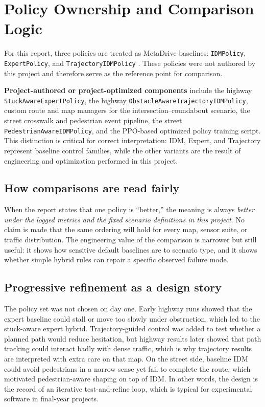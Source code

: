 \documentclass[12pt,a4paper]{report}
\begin{document}
\section{Policy Ownership and Comparison Logic}
For this report, three policies are treated as MetaDrive baselines: \texttt{IDMPolicy}, \texttt{ExpertPolicy}, and \texttt{TrajectoryIDMPolicy} \cite{metadrive,metadrive_docs}. These policies were not authored by this project and therefore serve as the reference point for comparison.

\noindent\textbf{Project-authored or project-optimized components} include the highway \texttt{StuckAwareExpertPolicy}, the highway \texttt{ObstacleAwareTrajectoryIDMPolicy}, custom route and map managers for the intersection--roundabout scenario, the street crosswalk and pedestrian event pipeline, the street \texttt{PedestrianAwareIDMPolicy}, and the PPO-based optimized policy training script. This distinction is critical for correct interpretation: IDM, Expert, and Trajectory represent baseline control families, while the other variants are the result of engineering and optimization performed in this project.

\subsection{How comparisons are read fairly}
When the report states that one policy is ``better,'' the meaning is always \emph{better under the logged metrics and the fixed scenario definitions in this project}. No claim is made that the same ordering will hold for every map, sensor suite, or traffic distribution. The engineering value of the comparison is narrower but still useful: it shows how sensitive default baselines are to scenario type, and it shows whether simple hybrid rules can repair a specific observed failure mode.

\subsection{Progressive refinement as a design story}
The policy set was not chosen on day one. Early highway runs showed that the expert baseline could stall or move too slowly under obstruction, which led to the stuck-aware expert hybrid. Trajectory-guided control was added to test whether a planned path would reduce hesitation, but highway results later showed that path tracking could interact badly with dense traffic, which is why trajectory results are interpreted with extra care on that map. On the street side, baseline IDM could avoid pedestrians in a narrow sense yet fail to complete the route, which motivated pedestrian-aware shaping on top of IDM. In other words, the design is the record of an iterative test-and-refine loop, which is typical for experimental software in final-year projects.
\end{document}

